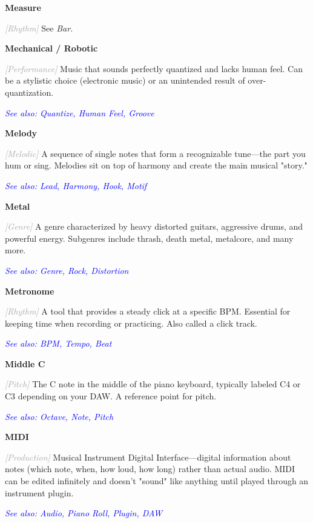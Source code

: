 \documentclass[11pt,letterpaper]{article}
\newcommand{\term}[1]{\textbf{\large\color{purple}#1}}
\newcommand{\category}[1]{\textcolor{darkgray}{\textit{\small [#1]}}}
\newcommand{\seealso}[1]{\textcolor{blue}{\textit{See also: #1}}}
\newenvironment{termdef}[1]
  {\noindent\term{#1}\par\nopagebreak}
  {\par\vspace{0.3em}}
\begin{document}
\begin{termdef}{Measure}
\category{Rhythm}
See \textit{Bar}.
\end{termdef}

\begin{termdef}{Mechanical / Robotic}
\category{Performance}
Music that sounds perfectly quantized and lacks human feel. Can be a stylistic choice (electronic music) or an unintended result of over-quantization.

\seealso{Quantize, Human Feel, Groove}
\end{termdef}

\begin{termdef}{Melody}
\category{Melodic}
A sequence of single notes that form a recognizable tune—the part you hum or sing. Melodies sit on top of harmony and create the main musical "story."

\seealso{Lead, Harmony, Hook, Motif}
\end{termdef}

\begin{termdef}{Metal}
\category{Genre}
A genre characterized by heavy distorted guitars, aggressive drums, and powerful energy. Subgenres include thrash, death metal, metalcore, and many more.

\seealso{Genre, Rock, Distortion}
\end{termdef}

\begin{termdef}{Metronome}
\category{Rhythm}
A tool that provides a steady click at a specific BPM. Essential for keeping time when recording or practicing. Also called a click track.

\seealso{BPM, Tempo, Beat}
\end{termdef}

\begin{termdef}{Middle C}
\category{Pitch}
The C note in the middle of the piano keyboard, typically labeled C4 or C3 depending on your DAW. A reference point for pitch.

\seealso{Octave, Note, Pitch}
\end{termdef}

\begin{termdef}{MIDI}
\category{Production}
Musical Instrument Digital Interface—digital information about notes (which note, when, how loud, how long) rather than actual audio. MIDI can be edited infinitely and doesn't "sound" like anything until played through an instrument plugin.

\seealso{Audio, Piano Roll, Plugin, DAW}
\end{termdef}
\end{document}
